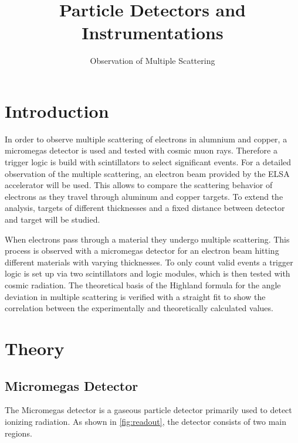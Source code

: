 \documentclass[sn-mathphys-num,iicol]{sn-jnl}
\theoremstyle{thmstyleone}
\theoremstyle{thmstyletwo}
\theoremstyle{thmstylethree}
\begin{document}
        
\title[]{Particle Detectors and Instrumentations}
\subtitle{Observation of Multiple Scattering}
\author*[1]{ }
\author*[1]{ }
\author*[1]{ }

\maketitle

\section{Introduction}
In order to observe multiple scattering of electrons in alumnium and copper, a micromegas detector is used and tested with cosmic muon rays. Therefore a trigger logic is build with scintillators to select significant events.
For a detailed observation of the multiple scattering, an electron beam provided by the ELSA accelerator will be used. This allows to compare the scattering behavior of electrons as they travel through aluminum and copper targets. To extend the analysis, targets of different thicknesses and a fixed distance between detector and target will be studied.  

When electrons pass through a material they undergo multiple scattering.
This process is observed with a micromegas detector for an electron beam hitting different materials with varying thicknesses.
To only count valid events a trigger logic is set up via two scintillators and logic modules, which is then tested with cosmic radiation.
The theoretical basis of the Highland formula for the angle deviation in multiple scattering is verified with a straight fit to show the correlation between the experimentally and theoretically calculated values.


\section{Theory}\label{sec:theory}
\subsection{Micromegas Detector}\label{subsec:theory_micromegas}
The Micromegas detector is a gaseous particle detector primarily used to detect ionizing radiation.
As shown in \autoref{fig:readout}, the detector consists of two main regions. 
\end{document}

